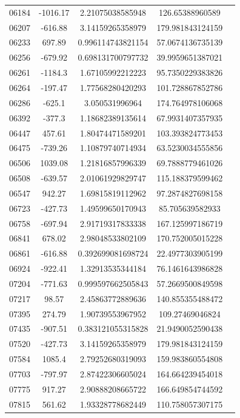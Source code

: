 {\begin{longtable}{ccccc}
06184 & -1016.17 & 2.21075038585948 & 126.65388960589 \\
06207 & -616.88 & 3.14159265358979 & 179.981843124159 \\
06233 & 697.89 & 0.996114743821154 & 57.0674136735139 \\
06256 & -679.92 & 0.698131700797732 & 39.9959651387021 \\
06261 & -1184.3 & 1.67105992212223 & 95.7350229383826 \\
06264 & -197.47 & 1.77568280420293 & 101.728867852786 \\
06286 & -625.1 & 3.050531996964 & 174.764978106068 \\
06392 & -377.3 & 1.18682389135614 & 67.9931407357935 \\
06447 & 457.61 & 1.80474471589201 & 103.393824773453 \\
06475 & -739.26 & 1.10879740714934 & 63.5230034555856 \\
06506 & 1039.08 & 1.21816857996339 & 69.7888779461026 \\
06508 & -639.57 & 2.01061929829747 & 115.188379599462 \\
06547 & 942.27 & 1.69815819112962 & 97.2874827698158 \\
06723 & -427.73 & 1.49599650170943 & 85.705639582933 \\
06758 & -697.94 & 2.91719317833338 & 167.125997186719 \\
06841 & 678.02 & 2.98048533802109 & 170.752005015228 \\
06861 & -616.88 & 0.392699081698724 & 22.4977303905199 \\
06924 & -922.41 & 1.32913535344184 & 76.1461643986828 \\
07204 & -771.63 & 0.999597662505843 & 57.2669500849598 \\
07217 & 98.57 & 2.45863772889636 & 140.855355488472 \\
07395 & 274.79 & 1.90739553967952 & 109.27469046824 \\
07435 & -907.51 & 0.383121055315828 & 21.9490052590438 \\
07520 & -427.73 & 3.14159265358979 & 179.981843124159 \\
07584 & 1085.4 & 2.79252680319093 & 159.983860554808 \\
07703 & -797.97 & 2.87422306605024 & 164.664239454018 \\
07775 & 917.27 & 2.90888208665722 & 166.649854744592 \\
07815 & 561.62 & 1.93328778682449 & 110.758057307175 \\

\end{longtable}}
